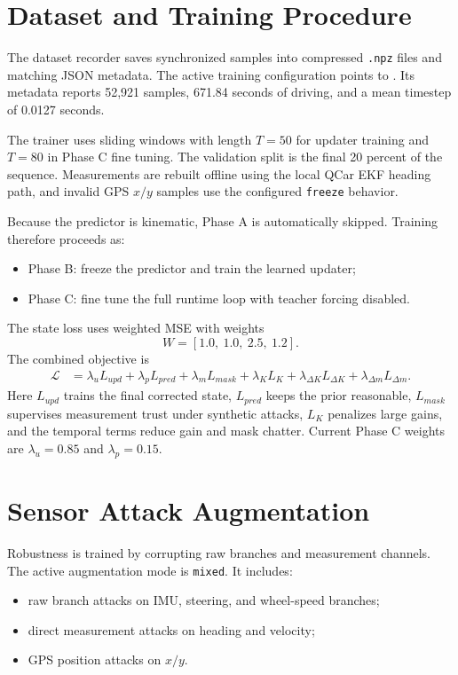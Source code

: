 \documentclass[11pt,a4paper]{article}
\begin{document}
\section{Dataset and Training Procedure}

The dataset recorder saves synchronized samples into compressed \texttt{.npz}
files and matching JSON metadata. The active training configuration points to
. Its metadata
reports 52,921 samples, 671.84 seconds of driving, and a mean timestep of
0.0127 seconds.

The trainer uses sliding windows with length $T=50$ for updater training and
$T=80$ in Phase C fine tuning. The validation split is the final 20 percent of
the sequence. Measurements are rebuilt offline using the local QCar EKF heading
path, and invalid GPS $x/y$ samples use the configured \texttt{freeze} behavior.

Because the predictor is kinematic, Phase A is automatically skipped. Training
therefore proceeds as:
\begin{itemize}
  \item Phase B: freeze the predictor and train the learned updater;
  \item Phase C: fine tune the full runtime loop with teacher forcing disabled.
\end{itemize}

The state loss uses weighted MSE with weights
\[
  W = [1.0,\ 1.0,\ 2.5,\ 1.2].
\]
The combined objective is
\begin{equation}
\begin{aligned}
  \mathcal{L}
  &=
  \lambda_u L_{upd}
  + \lambda_p L_{pred}
  + \lambda_m L_{mask}
  + \lambda_K L_K
  + \lambda_{\Delta K}L_{\Delta K}
  + \lambda_{\Delta m}L_{\Delta m}.
\end{aligned}
\end{equation}
Here $L_{upd}$ trains the final corrected state, $L_{pred}$ keeps the prior
reasonable, $L_{mask}$ supervises measurement trust under synthetic attacks,
$L_K$ penalizes large gains, and the temporal terms reduce gain and mask
chatter. Current Phase C weights are $\lambda_u=0.85$ and $\lambda_p=0.15$.

\section{Sensor Attack Augmentation}

Robustness is trained by corrupting raw branches and measurement channels. The
active augmentation mode is \texttt{mixed}. It includes:
\begin{itemize}
  \item raw branch attacks on IMU, steering, and wheel-speed branches;
  \item direct measurement attacks on heading and velocity;
  \item GPS position attacks on $x/y$.
\end{itemize}
\end{document}
